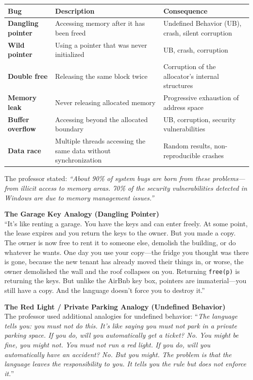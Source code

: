 \begin{center}
\begin{tabular}{|l|p{5.5cm}|p{5cm}|}
\hline
\textbf{Bug} & \textbf{Description} & \textbf{Consequence} \\
\hline
\textbf{Dangling pointer} & Accessing memory after it has been freed & Undefined Behavior (UB), crash, silent corruption \\
\hline
\textbf{Wild pointer} & Using a pointer that was never initialized & UB, crash, corruption \\
\hline
\textbf{Double free} & Releasing the same block twice & Corruption of the allocator's internal structures \\
\hline
\textbf{Memory leak} & Never releasing allocated memory & Progressive exhaustion of address space \\
\hline
\textbf{Buffer overflow} & Accessing beyond the allocated boundary & UB, corruption, security vulnerabilities \\
\hline
\textbf{Data race} & Multiple threads accessing the same data without synchronization & Random results, non-reproducible crashes \\
\hline
\end{tabular}
\end{center}

The professor stated: \emph{``About 90\% of system bugs are born from these problems---from illicit access to memory areas. 70\% of the security vulnerabilities detected in Windows are due to memory management issues.''}

\begin{insightbox}
\textbf{The Garage Key Analogy (Dangling Pointer)} \\
``It's like renting a garage. You have the keys and can enter freely. At some point, the lease expires and you return the keys to the owner. But you made a copy. The owner is now free to rent it to someone else, demolish the building, or do whatever he wants. One day you use your copy---the fridge you thought was there is gone, because the new tenant has already moved their things in, or worse, the owner demolished the wall and the roof collapses on you. Returning \texttt{free(p)} is returning the keys. But unlike the AirBnb key box, pointers are immaterial---you still have a copy. And the language doesn't force you to destroy it.''
\end{insightbox}

\begin{insightbox}
\textbf{The Red Light / Private Parking Analogy (Undefined Behavior)} \\
The professor used additional analogies for undefined behavior: ``\emph{The language tells you: you must not do this. It's like saying you must not park in a private parking space. If you do, will you automatically get a ticket? No. You might be fine, you might not. You must not run a red light. If you do, will you automatically have an accident? No. But you might. The problem is that the language leaves the responsibility to you. It tells you the rule but does not enforce it.}''
\end{insightbox}

